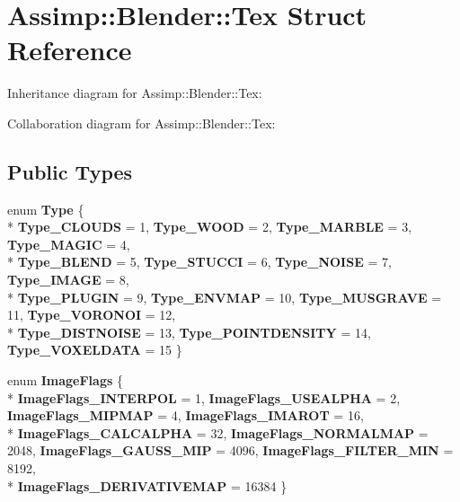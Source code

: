 \hypertarget{struct_assimp_1_1_blender_1_1_tex}{\section{Assimp\+:\+:Blender\+:\+:Tex Struct Reference}
\label{struct_assimp_1_1_blender_1_1_tex}
}


Inheritance diagram for Assimp\+:\+:Blender\+:\+:Tex\+:


Collaboration diagram for Assimp\+:\+:Blender\+:\+:Tex\+:
\subsection*{Public Types}
\begin{DoxyCompactItemize}
\item 
\hypertarget{struct_assimp_1_1_blender_1_1_tex_a0cce09333811aceecff3c9a6de737614}{enum {\bfseries Type} \{ \\*
{\bfseries Type\+\_\+\+C\+L\+O\+U\+D\+S} = 1, 
{\bfseries Type\+\_\+\+W\+O\+O\+D} = 2, 
{\bfseries Type\+\_\+\+M\+A\+R\+B\+L\+E} = 3, 
{\bfseries Type\+\_\+\+M\+A\+G\+I\+C} = 4, 
\\*
{\bfseries Type\+\_\+\+B\+L\+E\+N\+D} = 5, 
{\bfseries Type\+\_\+\+S\+T\+U\+C\+C\+I} = 6, 
{\bfseries Type\+\_\+\+N\+O\+I\+S\+E} = 7, 
{\bfseries Type\+\_\+\+I\+M\+A\+G\+E} = 8, 
\\*
{\bfseries Type\+\_\+\+P\+L\+U\+G\+I\+N} = 9, 
{\bfseries Type\+\_\+\+E\+N\+V\+M\+A\+P} = 10, 
{\bfseries Type\+\_\+\+M\+U\+S\+G\+R\+A\+V\+E} = 11, 
{\bfseries Type\+\_\+\+V\+O\+R\+O\+N\+O\+I} = 12, 
\\*
{\bfseries Type\+\_\+\+D\+I\+S\+T\+N\+O\+I\+S\+E} = 13, 
{\bfseries Type\+\_\+\+P\+O\+I\+N\+T\+D\+E\+N\+S\+I\+T\+Y} = 14, 
{\bfseries Type\+\_\+\+V\+O\+X\+E\+L\+D\+A\+T\+A} = 15
 \}}\label{struct_assimp_1_1_blender_1_1_tex_a0cce09333811aceecff3c9a6de737614}

\item 
\hypertarget{struct_assimp_1_1_blender_1_1_tex_a84ab98110d453a1f48a0739daa6e8d89}{enum {\bfseries Image\+Flags} \{ \\*
{\bfseries Image\+Flags\+\_\+\+I\+N\+T\+E\+R\+P\+O\+L} = 1, 
{\bfseries Image\+Flags\+\_\+\+U\+S\+E\+A\+L\+P\+H\+A} = 2, 
{\bfseries Image\+Flags\+\_\+\+M\+I\+P\+M\+A\+P} = 4, 
{\bfseries Image\+Flags\+\_\+\+I\+M\+A\+R\+O\+T} = 16, 
\\*
{\bfseries Image\+Flags\+\_\+\+C\+A\+L\+C\+A\+L\+P\+H\+A} = 32, 
{\bfseries Image\+Flags\+\_\+\+N\+O\+R\+M\+A\+L\+M\+A\+P} = 2048, 
{\bfseries Image\+Flags\+\_\+\+G\+A\+U\+S\+S\+\_\+\+M\+I\+P} = 4096, 
{\bfseries Image\+Flags\+\_\+\+F\+I\+L\+T\+E\+R\+\_\+\+M\+I\+N} = 8192, 
\\*
{\bfseries Image\+Flags\+\_\+\+D\+E\+R\+I\+V\+A\+T\+I\+V\+E\+M\+A\+P} = 16384
 \}}\label{struct_assimp_1_1_blender_1_1_tex_a84ab98110d453a1f48a0739daa6e8d89}

\end{DoxyCompactItemize}

